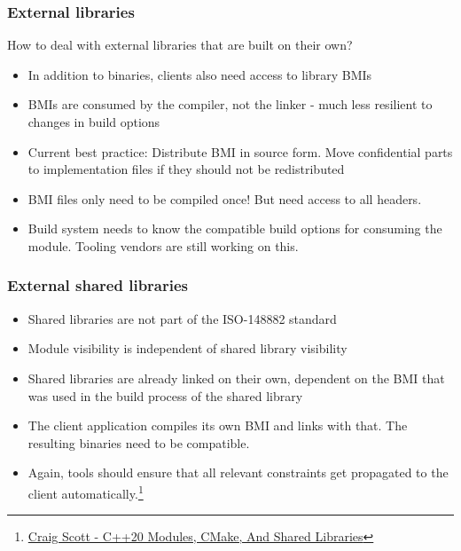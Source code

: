 \documentclass[aspectratio=169]{beamer}
\newif\iftransitions
\newcommand{\cpause}{\iftransitions \pause \fi}
\begin{document}
\begin{frame}[fragile]
  \frametitle{External libraries}

  How to deal with external libraries that are built on their own?
  \cpause
  \begin{itemize}
  \item In addition to binaries, clients also need access to library BMIs
  \cpause
  \item BMIs are consumed by the compiler, not the linker - much less resilient to changes in build options
  \cpause
  \item Current best practice: Distribute BMI in source form. Move confidential parts to implementation files if they should not be redistributed
  \cpause
  \item BMI files only need to be compiled once! But need access to all headers.
  \cpause
  \item Build system needs to know the compatible build options for consuming the module. Tooling vendors are still working on this.
  \end{itemize}
\end{frame}

\begin{frame}
  \frametitle{External shared libraries}

  \begin{itemize}
  \item Shared libraries are not part of the ISO-148882 standard
  \cpause
  \item Module visibility is independent of shared library visibility
  \cpause
  \item Shared libraries are already linked on their own, dependent on the BMI that was used in the build process of the shared library
  \cpause
  \item The client application compiles its own BMI and links with that. The resulting binaries need to be compatible.
  \cpause
  \item Again, tools should ensure that all relevant constraints get propagated to the client automatically.\footnote{\href{https://crascit.com/2024/04/04/cxx-modules-cmake-shared-libraries/}{Craig Scott - C++20 Modules, CMake, And Shared Libraries}}
  \end{itemize}
\end{frame}
\end{document}
